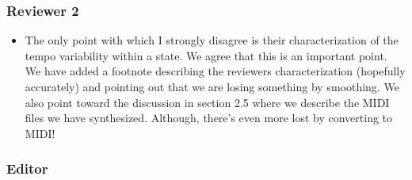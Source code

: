 \documentclass[12pt]{article}
\newcommand{\sresp}[1]{\textcolor{cobalt}{#1}}
\begin{document}
\subsubsection*{Reviewer 2}

\begin{itemize}
\item The only point with which I strongly disagree is their characterization 
  of the tempo variability within a state. \sresp{We agree that this is an important point. We have added a footnote describing the reviewers characterization (hopefully accurately) and pointing out that we are losing something by smoothing. We also point toward the discussion in section 2.5 where we describe the MIDI files we have synthesized. Although, there's even more lost by converting to MIDI!}
  \end{itemize}


\subsubsection*{Editor}
\end{document}
